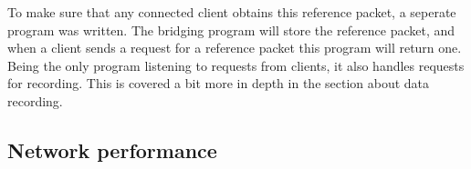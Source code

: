 To make sure that any connected client obtains this reference packet, a seperate program was written. The bridging program will store the reference packet, and when a client sends a request for a reference packet this program will return one. Being the only program listening to requests from clients, it also handles requests for recording. This is covered a bit more in depth in the section about data recording.

\subsection{Network performance}

